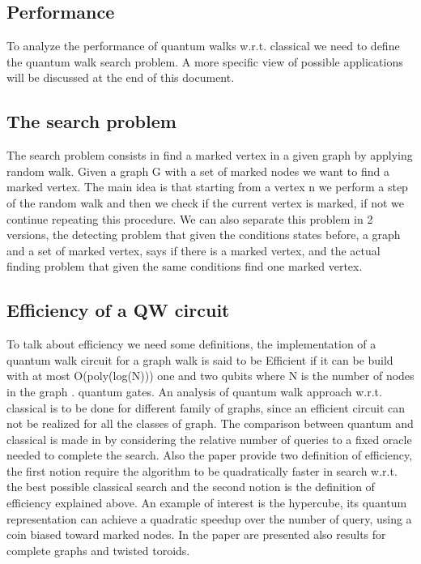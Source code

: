 \subsection{Performance}

To analyze the performance of quantum walks w.r.t. classical we need to define the quantum walk search problem. A more specific view of
possible applications will be discussed at the end of this document. 


\subsection{The search problem}

The search problem consists in find a marked vertex in a given graph by applying random walk. Given a graph G with a set of marked nodes
we want to find a marked vertex. The main idea is that starting from a vertex n we perform a step of the random walk and then we check if
the current vertex is marked, if not we continue repeating this procedure. We can also separate this problem in 2 versions, the detecting 
problem that given the conditions states before, a graph and a set of marked vertex, says if there is a marked vertex, and the actual finding
problem that given the same conditions find one marked vertex.


\subsection{Efficiency of a QW circuit}

To talk about efficiency we need some definitions, the implementation of a quantum walk circuit for a graph walk is said to be Efficient 
if it can be build with at most O(poly(log(N))) one and two qubits where N is the number of nodes in the graph \cite{douglas2007efficient}. 
quantum gates. An analysis of quantum walk approach w.r.t. classical is to be done for different family of graphs, since an efficient circuit
can not be realized for all the classes of graph. The comparison between quantum and classical is made in \cite{douglas2014complexity} by 
considering the relative number of queries to a fixed oracle needed to complete the search. Also the paper provide two definition of 
efficiency, the first notion require the algorithm to be quadratically faster in search w.r.t. the best possible classical search and the 
second notion is the definition of efficiency explained above. An example of interest is the hypercube, its quantum representation can
achieve a quadratic speedup over the number of query, using a coin biased toward marked nodes. In the paper are presented also results
for complete graphs and twisted toroids.    

